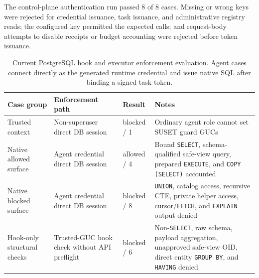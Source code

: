 \documentclass[journal]{IEEEtran}
\begin{document}
The control-plane authentication run
 passed 8 of 8
cases. Missing or wrong keys were rejected for credential issuance, task
issuance, and administrative registry reads; the configured key permitted
the expected calls; and request-body attempts to disable receipts or
budget accounting were rejected before token issuance.

\begin{table}[!t]
\centering
\scriptsize
\setlength{\tabcolsep}{3pt}
\caption{Current PostgreSQL hook and executor enforcement evaluation. Agent
cases connect directly as the generated runtime credential and issue
native SQL after binding a signed task token.}
\label{tab:postgres-hook}
\begin{tabular}{@{}
  >{\raggedright\arraybackslash}p{}
  >{\raggedright\arraybackslash}p{}
  >{\raggedright\arraybackslash}p{}
  >{\raggedright\arraybackslash}p{}@{}}
\toprule
Case group & Enforcement path & Result & Notes \\
\midrule
Trusted context & Non-superuser direct DB session & 1 blocked / 1 & Ordinary agent role cannot set SUSET guard GUCs \\
Native allowed surface & Agent credential direct DB session & 4 allowed / 4 & Bound \texttt{SELECT}, schema-qualified safe-view query, prepared \texttt{EXECUTE}, and \texttt{COPY (SELECT)} accounted \\
Native blocked surface & Agent credential direct DB session & 8 blocked / 8 & \texttt{UNION}, catalog access, recursive CTE, private helper access, cursor/\texttt{FETCH}, and \texttt{EXPLAIN} output denied \\
Hook-only structural checks & Trusted-GUC hook check without API preflight & 6 blocked / 6 & Non-\texttt{SELECT}, raw schema, payload aggregation, unapproved safe-view OID, direct entity \texttt{GROUP BY}, and \texttt{HAVING} denied \\
\bottomrule
\end{tabular}
\end{table}
\end{document}
